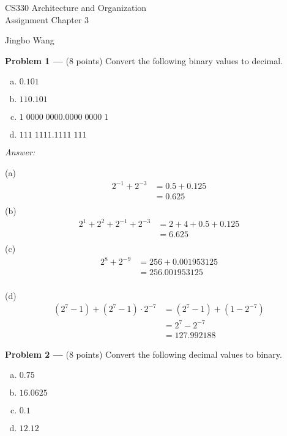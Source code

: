 \documentclass[11pt]{article}
\newcommand{\problem}[1]{\textbf{Problem #1 ---} }
\newcommand{\answer}{{\color{red}\textit{Answer: }}}
\begin{document}
\thispagestyle{empty}

\begin{center}
{\large CS330 Architecture and Organization}\\
Assignment Chapter 3
\end{center}

\begin{flushright}
Jingbo Wang
\end{flushright}

\problem{1}(8 points) Convert the following binary values to decimal.
\begin{enumerate}[(a)]
    \item $0.101$
    \item $110.101$
    \item $1\;0000\;0000.0000\;0000\;1$
    \item $111\;1111.1111\;111$
\end{enumerate}

\answer

(a)
\begin{align*}
 2^{-1}+2^{-3} &= 0.5+0.125\\ 
               &= 0.625\\ 
\end{align*}
(b)
\begin{align*}
 2^1+2^2+2^{-1}+2^{-3} &= 2+4+0.5+0.125\\ 
               &= 6.625\\ 
\end{align*}
(c)
\begin{align*}
 2^8+2^{-9} &= 256+0.001953125\\ 
               &= 256.001953125\\ 
\end{align*}

(d)
\begin{align*}
(2^7-1) + (2^7-1)\cdot 2^{-7} &= (2^7 - 1) + (1 - 2^{-7})\\ 
                              &= 2^7 - 2^{-7} \\
                              &= 127.992188
\end{align*}


\problem{2}(8 points) Convert the following decimal values to binary.
\begin{enumerate}[(a)]
    \item $0.75$
    \item $16.0625$
    \item $0.1$
    \item $12.12$
\end{enumerate}
\end{document}
